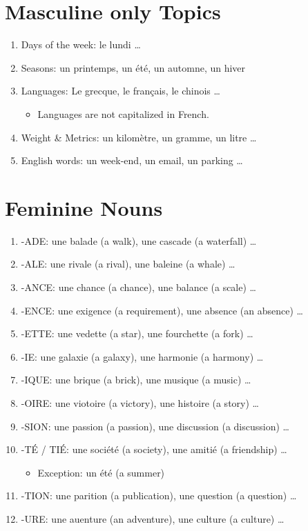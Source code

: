 \documentclass{book}
\begin{document}
    \section{Masculine only Topics}
        \begin{enumerate}
            \item Days of the week: le lundi \dots
            \item Seasons: un printemps, un été, un automne, un hiver
            \item Languages: Le grecque, le français, le chinois \dots
            \begin{itemize}
                \item Languages are not capitalized in French.
            \end{itemize}
            \item Weight \& Metrics: un kilomètre, un gramme, un litre \dots
            \item English words: un week-end, un email, un parking \dots
        \end{enumerate}
    
    \section{Feminine Nouns}
        \begin{enumerate}
            \item -ADE: une balade (a walk), une cascade (a waterfall) \dots
            \item -ALE: une rivale (a rival), une baleine (a whale) \dots
            \item -ANCE: une chance (a chance), une balance (a scale) \dots
            \item -ENCE: une exigence (a requirement), une absence (an absence) \dots
            \item -ETTE: une vedette (a star), une fourchette (a fork) \dots
            \item -IE: une galaxie (a galaxy), une harmonie (a harmony) \dots
            \item -IQUE: une brique (a brick), une musique (a music) \dots
            \item -OIRE: une viotoire (a victory), une histoire (a story) \dots
            \item -SION: une passion (a passion), une discussion (a discussion) \dots
            \item -TÉ / TIÉ: une société (a society), une amitié (a friendship) \dots
            \begin{itemize}
                \item Exception: un été (a summer)
            \end{itemize}
            \item -TION: une parition (a publication), une question (a question) \dots
            \item -URE: une auenture (an adventure), une culture (a culture) \dots
        \end{enumerate}
\end{document}
